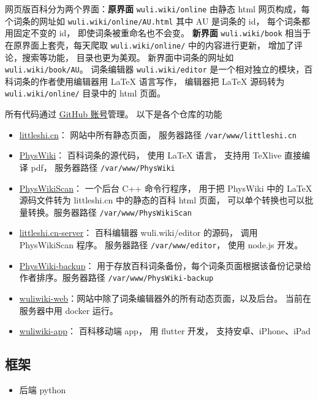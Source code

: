 
网页版百科分为两个界面：\textbf{原界面} \verb|wuli.wiki/online| 由静态 html 网页构成，每个词条的网址如 \verb|wuli.wiki/online/AU.html| 其中 AU 是词条的 id， 每个词条都用固定不变的 id， 即使词条被重命名也不会变。  \textbf{新界面} \verb|wuli.wiki/book| 相当于在原界面上套壳，每天爬取 \verb|wuli.wiki/online/| 中的内容进行更新， 增加了评论，搜索等功能， 目录也更为美观。 新界面中词条的网址如 \verb|wuli.wiki/book/AU|。
词条编辑器 \verb|wuli.wiki/editor| 是一个相对独立的模块，百科词条的作者使用编辑器用 LaTeX 语言写作， 编辑器把 LaTeX 源码转为 \verb|wuli.wiki/online/| 目录中的 html 页面。

所有代码通过 \href{https://github.com/wuliwiki}{GitHub 账号}管理。 以下是各个仓库的功能
\begin{itemize}
\item \href{https://github.com/MacroUniverse/littleshi.cn}{littleshi.cn}： 网站中所有静态页面， 服务器路径 \verb|/var/www/littleshi.cn|
\item \href{https://github.com/MacroUniverse/PhysWiki}{PhysWiki}： 百科词条的源代码， 使用 LaTeX 语言， 支持用 TeXlive 直接编译 pdf， 服务器路径 \verb|/var/www/PhysWiki|
\item \href{https://github.com/MacroUniverse/PhysWikiScan}{PhysWikiScan}： 一个后台 C++ 命令行程序， 用于把 PhysWiki 中的 LaTeX 源码文件转为 littleshi.cn 中的静态的百科 html 页面， 可以单个转换也可以批量转换。服务器路径 \verb|/var/www/PhysWikiScan|
\item \href{https://github.com/MacroUniverse/littleshi.cn-server}{littleshi.cn-server}： 百科编辑器 wuli.wiki/editor 的源码， 调用 PhysWikiScan 程序。 服务器路径 \verb|/var/www/editor|， 使用 node.js 开发。
\item \href{https://github.com/MacroUniverse/PhysWiki-backup}{PhysWiki-backup}： 用于存放百科词条备份，每个词条页面根据该备份记录给作者排序。服务器路径 \verb|/var/www/PhysWiki-backup|
\item \href{https://github.com/MacroUniverse/wuliwiki-web}{wuliwiki-web}：网站中除了词条编辑器外的所有动态页面，以及后台。 当前在服务器中用 docker 运行。
\item \href{https://github.com/MacroUniverse/wuliwiki-app}{wuliwiki-app}： 百科移动端 app， 用 flutter 开发， 支持安卓、iPhone、iPad
\end{itemize}

\subsection{框架}
\begin{itemize}
\item 后端 python
\end{itemize}
